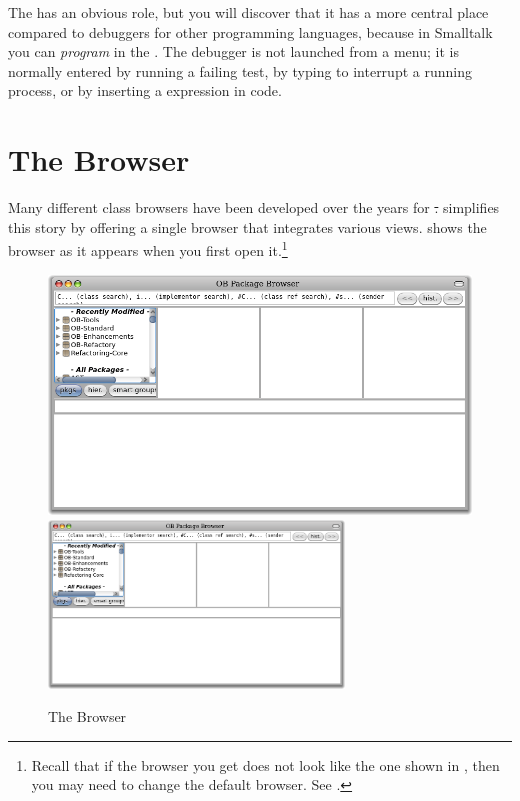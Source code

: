 \documentclass[a4paper,10pt,twoside]{book}
\begin{document}
The  has an obvious role, but you will discover that it has a more central place compared to debuggers for other programming languages, because in Smalltalk you can \emph{program} in the .  The debugger is not launched from a menu; it is normally entered by running a failing test, by typing  to interrupt a running process, or by inserting a  expression in code.

\section{The Browser}

Many different class browsers have been developed over the years for \st.
\pharo simplifies this story by offering a single browser that integrates various views.
 shows the browser as it appears when you first open it.\footnote{Recall that if the browser you get does not look like the one shown in , then you may need to change the default browser.  See .}

\begin{figure}[htbp]
   \centering
   \ifluluelse
	 {\includegraphics[width=\textwidth]{SystemBrowser0} }
	 {\includegraphics[width=0.7\textwidth]{SystemBrowser0} }
   \caption{The Browser}
\end{figure}
\end{document}
